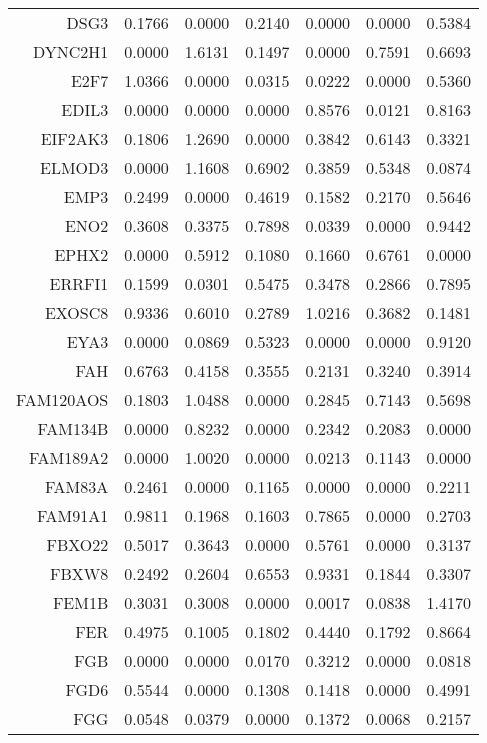 \begin{longtable}{rrrrrrr}
  DSG3 & 0.1766 & 0.0000 & 0.2140 & 0.0000 & 0.0000 & 0.5384 \\ 
  DYNC2H1 & 0.0000 & 1.6131 & 0.1497 & 0.0000 & 0.7591 & 0.6693 \\ 
  E2F7 & 1.0366 & 0.0000 & 0.0315 & 0.0222 & 0.0000 & 0.5360 \\ 
  EDIL3 & 0.0000 & 0.0000 & 0.0000 & 0.8576 & 0.0121 & 0.8163 \\ 
  EIF2AK3 & 0.1806 & 1.2690 & 0.0000 & 0.3842 & 0.6143 & 0.3321 \\ 
  ELMOD3 & 0.0000 & 1.1608 & 0.6902 & 0.3859 & 0.5348 & 0.0874 \\ 
  EMP3 & 0.2499 & 0.0000 & 0.4619 & 0.1582 & 0.2170 & 0.5646 \\ 
  ENO2 & 0.3608 & 0.3375 & 0.7898 & 0.0339 & 0.0000 & 0.9442 \\ 
  EPHX2 & 0.0000 & 0.5912 & 0.1080 & 0.1660 & 0.6761 & 0.0000 \\ 
  ERRFI1 & 0.1599 & 0.0301 & 0.5475 & 0.3478 & 0.2866 & 0.7895 \\ 
  EXOSC8 & 0.9336 & 0.6010 & 0.2789 & 1.0216 & 0.3682 & 0.1481 \\ 
  EYA3 & 0.0000 & 0.0869 & 0.5323 & 0.0000 & 0.0000 & 0.9120 \\ 
  FAH & 0.6763 & 0.4158 & 0.3555 & 0.2131 & 0.3240 & 0.3914 \\ 
  FAM120AOS & 0.1803 & 1.0488 & 0.0000 & 0.2845 & 0.7143 & 0.5698 \\ 
  FAM134B & 0.0000 & 0.8232 & 0.0000 & 0.2342 & 0.2083 & 0.0000 \\ 
  FAM189A2 & 0.0000 & 1.0020 & 0.0000 & 0.0213 & 0.1143 & 0.0000 \\ 
  FAM83A & 0.2461 & 0.0000 & 0.1165 & 0.0000 & 0.0000 & 0.2211 \\ 
  FAM91A1 & 0.9811 & 0.1968 & 0.1603 & 0.7865 & 0.0000 & 0.2703 \\ 
  FBXO22 & 0.5017 & 0.3643 & 0.0000 & 0.5761 & 0.0000 & 0.3137 \\ 
  FBXW8 & 0.2492 & 0.2604 & 0.6553 & 0.9331 & 0.1844 & 0.3307 \\ 
  FEM1B & 0.3031 & 0.3008 & 0.0000 & 0.0017 & 0.0838 & 1.4170 \\ 
  FER & 0.4975 & 0.1005 & 0.1802 & 0.4440 & 0.1792 & 0.8664 \\ 
  FGB & 0.0000 & 0.0000 & 0.0170 & 0.3212 & 0.0000 & 0.0818 \\ 
  FGD6 & 0.5544 & 0.0000 & 0.1308 & 0.1418 & 0.0000 & 0.4991 \\ 
  FGG & 0.0548 & 0.0379 & 0.0000 & 0.1372 & 0.0068 & 0.2157 \\ 

\end{longtable}
